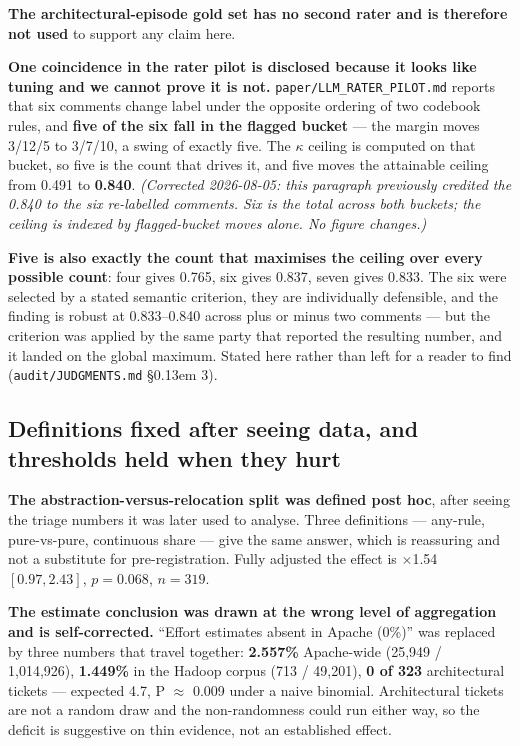\documentclass[11pt,a4paper]{article}
\begin{document}
\textbf{The architectural-episode gold set has no second rater and is therefore not used} to support any claim here.

\textbf{One coincidence in the rater pilot is disclosed because it looks like tuning and we cannot prove it is not.} \texttt{paper/\allowbreak{}LLM\_\allowbreak{}RATER\_\allowbreak{}PILOT.\allowbreak{}md} reports that six comments change label under the opposite ordering of two codebook rules, and \textbf{five of the six fall in the flagged bucket} --- the margin moves 3/12/5 to 3/7/10, a swing of exactly five. The $\kappa$ ceiling is computed on that bucket, so five is the count that drives it, and five moves the attainable ceiling from 0.491 to \textbf{0.840}. \emph{(Corrected 2026-08-05: this paragraph previously credited the 0.840 to the six re-labelled comments. Six is the total across both buckets; the ceiling is indexed by flagged-bucket moves alone. No figure changes.)}

\textbf{Five is also exactly the count that maximises the ceiling over every possible count}: four gives 0.765, six gives 0.837, seven gives 0.833. The six were selected by a stated semantic criterion, they are individually defensible, and the finding is robust at 0.833--0.840 across plus or minus two comments --- but the criterion was applied by the same party that reported the resulting number, and it landed on the global maximum. Stated here rather than left for a reader to find (\texttt{audit/\allowbreak{}JUDGMENTS.\allowbreak{}md} \S\kern0.13em 3).

\subsection{Definitions fixed after seeing data, and thresholds held when they hurt}
\label{sec:6.6}

\textbf{The abstraction-versus-relocation split was defined post hoc}, after seeing the triage numbers it was later used to analyse. Three definitions --- any-rule, pure-vs-pure, continuous share --- give the same answer, which is reassuring and not a substitute for pre-registration. Fully adjusted the effect is $\times$1.54 $[0.97, 2.43]$, $p=0.068$, $n=319$.

\textbf{The estimate conclusion was drawn at the wrong level of aggregation and is self-corrected.} ``Effort estimates absent in Apache (0\%)'' was replaced by three numbers that travel together: \textbf{2.557\%} Apache-wide (25,949 / 1,014,926), \textbf{1.449\%} in the Hadoop corpus (713 / 49,201), \textbf{0 of 323} architectural tickets --- expected 4.7, P $\approx$ 0.009 under a naive binomial. Architectural tickets are not a random draw and the non-randomness could run either way, so the deficit is suggestive on thin evidence, not an established effect.
\end{document}
